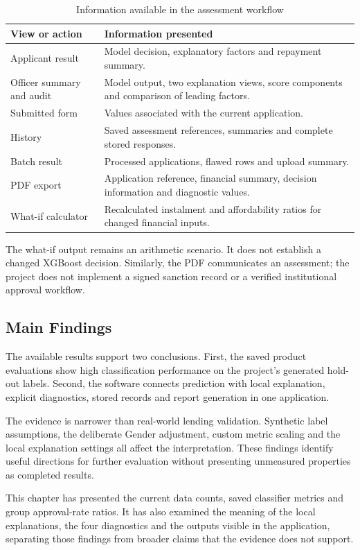 \begin{table}[htbp]\centering\small
\caption{Information available in the assessment workflow}\label{tab:interface-results}
\begin{tabularx}{\textwidth}{p{3.9cm}X}\toprule
View or action & Information presented\\\midrule
Applicant result & Model decision, explanatory factors and repayment summary.\\
Officer summary and audit & Model output, two explanation views, score components and comparison of leading factors.\\
Submitted form & Values associated with the current application.\\
History & Saved assessment references, summaries and complete stored responses.\\
Batch result & Processed applications, flawed rows and upload summary.\\
PDF export & Application reference, financial summary, decision information and diagnostic values.\\
What-if calculator & Recalculated instalment and affordability ratios for changed financial inputs.\\\bottomrule
\end{tabularx}\end{table}

The what-if output remains an arithmetic scenario. It does not establish a changed XGBoost decision. Similarly, the PDF communicates an assessment; the project does not implement a signed sanction record or a verified institutional approval workflow.

\subsection{Main Findings}
The available results support two conclusions. First, the saved product evaluations show high classification performance on the project's generated hold-out labels. Second, the software connects prediction with local explanation, explicit diagnostics, stored records and report generation in one application.

The evidence is narrower than real-world lending validation. Synthetic label assumptions, the deliberate Gender adjustment, custom metric scaling and the local explanation settings all affect the interpretation. These findings identify useful directions for further evaluation without presenting unmeasured properties as completed results.

\par\medskip\noindent
This chapter has presented the current data counts, saved classifier metrics and group approval-rate ratios. It has also examined the meaning of the local explanations, the four diagnostics and the outputs visible in the application, separating those findings from broader claims that the evidence does not support.
